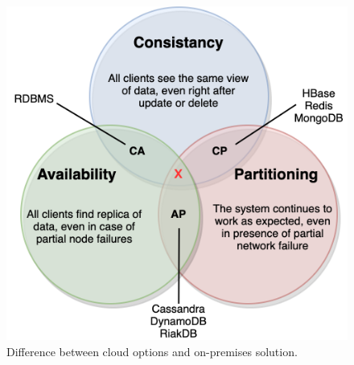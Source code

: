 \begin{figure}[H]
	\begin{center}
		\includegraphics[scale=0.85]{images/Figure17.png}
	\end{center}
	\vspace{-0.6cm}
	\caption{Difference between cloud options and on-premises solution.}
	\label{fig:fig17}
\end{figure}

